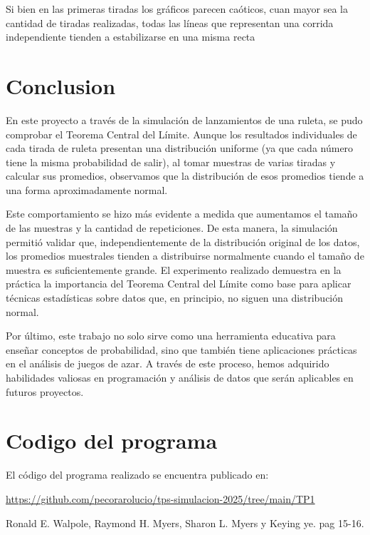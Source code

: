 \documentclass{article}
\begin{document}
Si bien en las primeras tiradas los gráficos parecen caóticos, cuan mayor sea la cantidad de tiradas realizadas, todas las líneas que representan una corrida independiente tienden a estabilizarse en una misma recta


\section{Conclusion}
En este proyecto a través de la simulación de lanzamientos de una ruleta, se pudo comprobar el Teorema Central del Límite. Aunque los resultados individuales de cada tirada de ruleta presentan una distribución uniforme (ya que cada número tiene la misma probabilidad de salir), al tomar muestras de varias tiradas y calcular sus promedios, observamos que la distribución de esos promedios tiende a una forma aproximadamente normal.

Este comportamiento se hizo más evidente a medida que aumentamos el tamaño de las muestras y la cantidad de repeticiones. De esta manera, la simulación permitió validar que, independientemente de la distribución original de los datos, los promedios muestrales tienden a distribuirse normalmente cuando el tamaño de muestra es suficientemente grande. El experimento realizado demuestra en la práctica la importancia del Teorema Central del Límite como base para aplicar técnicas estadísticas sobre datos que, en principio, no siguen una distribución normal.

Por último, este trabajo no solo sirve como una herramienta educativa para enseñar conceptos de probabilidad, sino que también tiene aplicaciones prácticas en el análisis de juegos de azar. A través de este proceso, hemos adquirido habilidades valiosas en programación y análisis de datos que serán aplicables en futuros proyectos.

\section{Codigo del programa}
El código del programa realizado se encuentra publicado en:
\begin{center}
  \url{https://github.com/pecorarolucio/tps-simulacion-2025/tree/main/TP1}
\end{center}


 


\begin{thebibliography}{1}

Ronald E. Walpole, Raymond H. Myers, Sharon L. Myers y Keying ye.
 pag 15-16.
\end{thebibliography}
\end{document}
